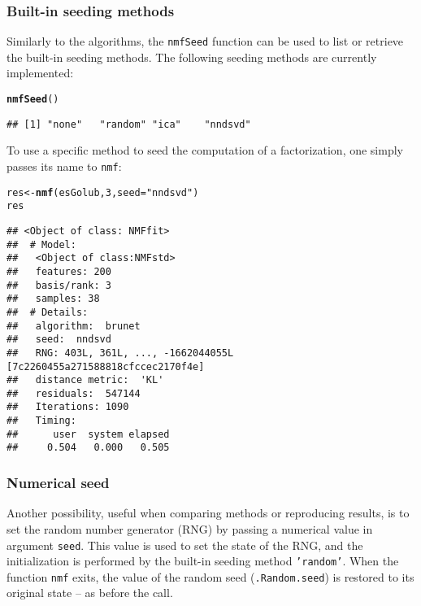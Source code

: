 \documentclass[a4paper]{article}\usepackage[]{graphicx}\usepackage[]{color}
\makeatletter
\newcommand{\hlnum}[1]{\textcolor[rgb]{0.686,0.059,0.569}{#1}}%
\newcommand{\hlstr}[1]{\textcolor[rgb]{0.192,0.494,0.8}{#1}}%
\newcommand{\hlstd}[1]{\textcolor[rgb]{0.345,0.345,0.345}{#1}}%
\newcommand{\hlkwb}[1]{\textcolor[rgb]{0.69,0.353,0.396}{#1}}%
\newcommand{\hlkwc}[1]{\textcolor[rgb]{0.333,0.667,0.333}{#1}}%
\newcommand{\hlkwd}[1]{\textcolor[rgb]{0.737,0.353,0.396}{\textbf{#1}}}%
\newenvironment{kframe}{%
 \def\at@end@of@kframe{}%
 \ifinner\ifhmode%
  \def\at@end@of@kframe{\end{minipage}}%
  \begin{minipage}{\columnwidth}%
 \fi\fi%
 \def\FrameCommand##1{\hskip\@totalleftmargin \hskip-\fboxsep
 \colorbox{shadecolor}{##1}\hskip-\fboxsep
     \hskip-\linewidth \hskip-\@totalleftmargin \hskip\columnwidth}%
 \MakeFramed {\advance\hsize-\width
   \@totalleftmargin\z@ \linewidth\hsize
   \@setminipage}}%
 {\par\unskip\endMakeFramed%
 \at@end@of@kframe}
\newenvironment{knitrout}{}{} %
\let\code=\texttt
\makeatother
\begin{document}
\subsubsection{Built-in seeding methods}
Similarly to the algorithms, the \code{nmfSeed} function can be used to list or retrieve the built-in seeding methods.
The following seeding methods are currently implemented:

\begin{knitrout}
\color{fgcolor}\begin{kframe}
\begin{alltt}
\hlkwd{nmfSeed}\hlstd{()}
\end{alltt}
\begin{verbatim}
## [1] "none"   "random" "ica"    "nndsvd"
\end{verbatim}
\end{kframe}
\end{knitrout}


To use a specific method to seed the computation of a factorization, one simply passes its name to \code{nmf}:

\begin{knitrout}
\color{fgcolor}\begin{kframe}
\begin{alltt}
\hlstd{res} \hlkwb{<-} \hlkwd{nmf}\hlstd{(esGolub,} \hlnum{3}\hlstd{,} \hlkwc{seed} \hlstd{=} \hlstr{"nndsvd"}\hlstd{)}
\hlstd{res}
\end{alltt}
\begin{verbatim}
## <Object of class: NMFfit>
##  # Model:
##   <Object of class:NMFstd>
##   features: 200 
##   basis/rank: 3 
##   samples: 38 
##  # Details:
##   algorithm:  brunet 
##   seed:  nndsvd 
##   RNG: 403L, 361L, ..., -1662044055L [7c2260455a271588818cfccec2170f4e]
##   distance metric:  'KL' 
##   residuals:  547144 
##   Iterations: 1090 
##   Timing:
##      user  system elapsed 
##     0.504   0.000   0.505
\end{verbatim}
\end{kframe}
\end{knitrout}


\subsubsection{Numerical seed}\label{sec:numseed}
Another possibility, useful when comparing methods or reproducing results, is to set the random number generator (RNG) by passing a numerical value in argument \code{seed}.
This value is used to set the state of the RNG, and the initialization is performed by the built-in seeding method \code{'random'}.
When the function \code{nmf} exits, the value of the random seed (\code{.Random.seed}) is restored to its original state -- as before the call.
\end{document}
